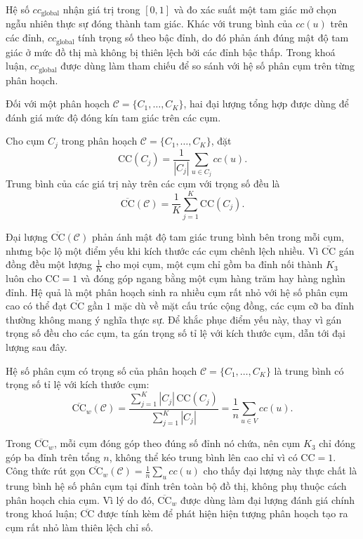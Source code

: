 Hệ số $cc_{\mathrm{global}}$ nhận giá trị trong $[0, 1]$ và đo xác suất một tam giác mở chọn ngẫu nhiên thực sự đóng thành tam giác. Khác với trung bình của $cc(u)$ trên các đỉnh, $cc_{\mathrm{global}}$ tính trọng số theo bậc đỉnh, do đó phản ánh đúng mật độ tam giác ở mức đồ thị mà không bị thiên lệch bởi các đỉnh bậc thấp. Trong khoá luận, $cc_{\mathrm{global}}$ được dùng làm tham chiếu để so sánh với hệ số phân cụm trên từng phân hoạch.

Đối với một phân hoạch $\mathcal{C} = \{C_1, \ldots, C_K\}$, hai đại lượng tổng hợp được dùng để đánh giá mức độ đóng kín tam giác trên các cụm.

\begin{definition}
\label{def:cc-cluster}
Cho cụm $C_j$ trong phân hoạch $\mathcal{C} = \{C_1, \ldots, C_K\}$, đặt
\[
    \mathrm{CC}(C_j) = \frac{1}{|C_j|} \sum_{u \in C_j} cc(u).
\]
Trung bình của các giá trị này trên các cụm với trọng số đều là
\[
    \overline{\mathrm{CC}}(\mathcal{C}) = \frac{1}{K} \sum_{j=1}^K \mathrm{CC}(C_j).
\]
\end{definition}

Đại lượng $\overline{\mathrm{CC}}(\mathcal{C})$ phản ánh mật độ tam giác trung bình bên trong mỗi cụm, nhưng bộc lộ một điểm yếu khi kích thước các cụm chênh lệch nhiều. Vì $\overline{\mathrm{CC}}$ gán đồng đều một lượng $\tfrac{1}{K}$ cho mọi cụm, một cụm chỉ gồm ba đỉnh nối thành $K_3$ luôn cho $\mathrm{CC} = 1$ và đóng góp ngang bằng một cụm hàng trăm hay hàng nghìn đỉnh. Hệ quả là một phân hoạch sinh ra nhiều cụm rất nhỏ với hệ số phân cụm cao có thể đạt $\overline{\mathrm{CC}}$ gần $1$ mặc dù về mặt cấu trúc cộng đồng, các cụm cỡ ba đỉnh thường không mang ý nghĩa thực sự. Để khắc phục điểm yếu này, thay vì gán trọng số đều cho các cụm, ta gán trọng số tỉ lệ với kích thước cụm, dẫn tới đại lượng sau đây.

\begin{definition}
\label{def:cc-weighted}
Hệ số phân cụm có trọng số của phân hoạch $\mathcal{C} = \{C_1, \ldots, C_K\}$ là trung bình có trọng số tỉ lệ với kích thước cụm:
\[
    \overline{\mathrm{CC}}_w(\mathcal{C})
        = \frac{\sum_{j=1}^K |C_j| \, \mathrm{CC}(C_j)}{\sum_{j=1}^K |C_j|}
        = \frac{1}{n} \sum_{u \in V} cc(u).
\]
\end{definition}

Trong $\overline{\mathrm{CC}}_w$, mỗi cụm đóng góp theo đúng số đỉnh nó chứa, nên cụm $K_3$ chỉ đóng góp ba đỉnh trên tổng $n$, không thể kéo trung bình lên cao chỉ vì có $\mathrm{CC} = 1$. Công thức rút gọn $\overline{\mathrm{CC}}_w(\mathcal{C}) = \tfrac{1}{n}\sum_{u} cc(u)$ cho thấy đại lượng này thực chất là trung bình hệ số phân cụm tại đỉnh trên toàn bộ đồ thị, không phụ thuộc cách phân hoạch chia cụm. Vì lý do đó, $\overline{\mathrm{CC}}_w$ được dùng làm đại lượng đánh giá chính trong khoá luận; $\overline{\mathrm{CC}}$ được tính kèm để phát hiện hiện tượng phân hoạch tạo ra cụm rất nhỏ làm thiên lệch chỉ số.

